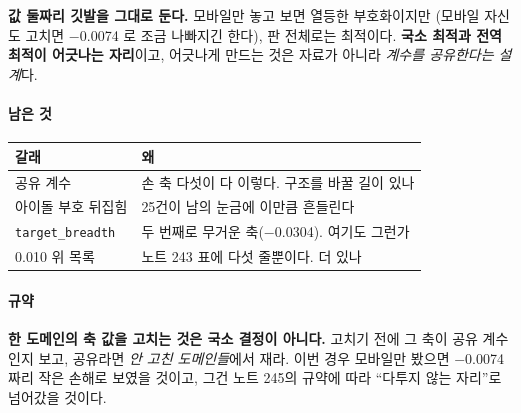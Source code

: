 \documentclass[10pt]{article}
\begin{document}
\textbf{값 둘짜리 깃발을 그대로 둔다.} 모바일만 놓고 보면 열등한 부호화이지만
(모바일 자신도 고치면 $-$0.0074 로 조금 나빠지긴 한다), 판 전체로는 최적이다.
\textbf{국소 최적과 전역 최적이 어긋나는 자리}이고, 어긋나게 만드는 것은
자료가 아니라 \emph{계수를 공유한다는 설계}다.

\paragraph{남은 것}
\begin{center}\small
\begin{tabular}{ll}
\hline
갈래 & 왜 \\
\hline
공유 계수 & 손 축 다섯이 다 이렇다. 구조를 바꿀 길이 있나 \\
아이돌 부호 뒤집힘 & 25건이 남의 눈금에 이만큼 흔들린다 \\
\texttt{target\_breadth} & 두 번째로 무거운 축($-$0.0304). 여기도 그런가 \\
0.010 위 목록 & 노트 243 표에 다섯 줄뿐이다. 더 있나 \\
\hline
\end{tabular}
\end{center}

\paragraph{규약} \textbf{한 도메인의 축 값을 고치는 것은 국소 결정이 아니다.}
고치기 전에 그 축이 공유 계수인지 보고, 공유라면 \emph{안 고친 도메인들}에서
재라. 이번 경우 모바일만 봤으면 $-$0.0074 짜리 작은 손해로 보였을 것이고,
그건 노트 245의 규약에 따라 ``다투지 않는 자리''로 넘어갔을 것이다.
\end{document}

